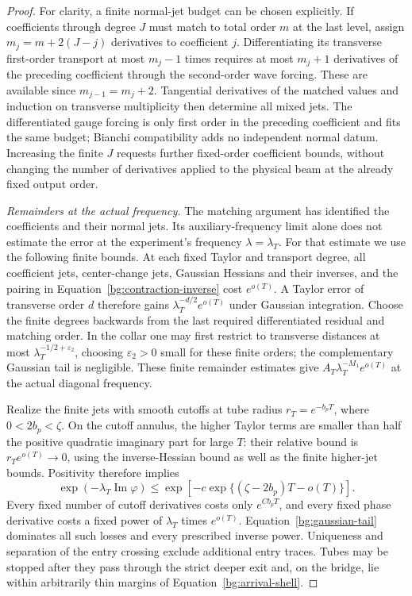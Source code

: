 \begin{proof}
For clarity, a finite normal-jet budget can be chosen explicitly.
If coefficients through degree $J$ must match to total order $m$
at the last level, assign $m_j=m+2(J-j)$ derivatives to coefficient
$j$. Differentiating its transverse first-order transport at most
$m_j-1$ times requires at most $m_j+1$ derivatives of the preceding
coefficient through the second-order wave forcing. These are
available since $m_{j-1}=m_j+2$. Tangential derivatives of the
matched values and induction on transverse multiplicity then
determine all mixed jets. The differentiated gauge forcing is
only first order in the preceding coefficient and fits the same
budget; Bianchi compatibility adds no independent normal datum.
Increasing the finite $J$ requests further fixed-order coefficient
bounds, without changing the number of derivatives applied to the
physical beam at the already fixed output order.

\emph{Remainders at the actual frequency.}
The matching argument has identified the coefficients and their normal
jets. Its auxiliary-frequency limit alone does not estimate the error
at the experiment's frequency $\lambda=\lambda_T$. For that estimate
we use the following finite bounds.  At each fixed Taylor and transport degree, all
coefficient jets, center-change jets, Gaussian Hessians and their
inverses, and the pairing in Equation~\eqref{bg:contraction-inverse}
cost $e^{o(T)}$.  A Taylor error of transverse order $d$ therefore
gains $\lambda_T^{-d/2}e^{o(T)}$ under Gaussian integration.
Choose the finite degrees backwards from the last required
differentiated residual and matching order.  In the collar one
may first restrict to transverse distances at most
$\lambda_T^{-1/2+\varepsilon_2}$, choosing $\varepsilon_2>0$
small for these finite orders; the complementary Gaussian tail
is negligible.  These finite remainder estimates give
$A_T\lambda_T^{-M_1}e^{o(T)}$ at the actual diagonal frequency.

Realize the finite jets with smooth cutoffs at tube radius
$r_T=e^{-b_pT}$, where $0<2b_p<\zeta$.  On the cutoff annulus,
the higher Taylor terms are smaller than half the positive
quadratic imaginary part for large $T$: their relative bound is
$r_Te^{o(T)}\to0$, using the inverse-Hessian bound as well as
the finite higher-jet bounds.  Positivity therefore implies
\begin{equation}\label{bg:gaussian-tail}
 \exp(-\lambda_T\operatorname{Im}\varphi)
 \le \exp\left[-c\exp\{(\zeta-2b_p)T-o(T)\}\right].
\end{equation}
Every fixed number of cutoff derivatives costs only $e^{Cb_pT}$,
and every fixed phase derivative costs a fixed power of
$\lambda_T$ times $e^{o(T)}$.  Equation~\eqref{bg:gaussian-tail}
dominates all such losses and every prescribed inverse power.
Uniqueness and separation of the entry crossing exclude additional
entry traces.  Tubes may be stopped after they pass through the
strict deeper exit and, on the bridge, lie within arbitrarily
thin margins of Equation~\eqref{bg:arrival-shell}.


\end{proof}
